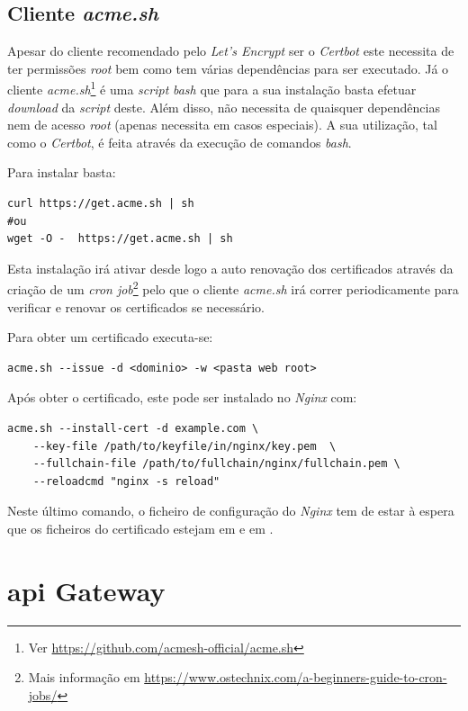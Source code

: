 \subsection{Cliente \textit{acme.sh}}\label{sec:soaACMEsh}
Apesar do cliente recomendado pelo \textit{Let's Encrypt} ser o \textit{Certbot} este necessita de ter permissões \textit{root} bem como tem várias dependências para ser executado. Já o cliente \textit{acme.sh}\footnote{Ver \url{https://github.com/acmesh-official/acme.sh}} é uma \textit{script} \textit{bash} que para a sua instalação basta efetuar \textit{download} da \textit{script} deste. Além disso, não necessita de quaisquer dependências nem de acesso \textit{root} (apenas necessita em casos especiais). A sua utilização, tal como o \textit{Certbot}, é feita através da execução de comandos \textit{bash}.

Para instalar basta:
\begin{verbatim}
curl https://get.acme.sh | sh
#ou
wget -O -  https://get.acme.sh | sh
\end{verbatim}

Esta instalação irá ativar desde logo a auto renovação dos certificados através da criação de um \textit{cron job}\footnote{Mais informação em \url{https://www.ostechnix.com/a-beginners-guide-to-cron-jobs/}} pelo que o cliente \textit{acme.sh} irá correr periodicamente para verificar e renovar os certificados se necessário.

Para obter um certificado executa-se:
\begin{verbatim}
acme.sh --issue -d <dominio> -w <pasta web root>
\end{verbatim}

Após obter o certificado, este pode ser instalado no \textit{Nginx} com:
\begin{verbatim}
acme.sh --install-cert -d example.com \
    --key-file /path/to/keyfile/in/nginx/key.pem  \
    --fullchain-file /path/to/fullchain/nginx/fullchain.pem \
    --reloadcmd "nginx -s reload"
\end{verbatim}

Neste último comando, o ficheiro de configuração do \textit{Nginx} tem de estar à espera que os ficheiros do certificado estejam em  e em .

\section{\acrshort{api} Gateway}\label{sec:api_gateway}

